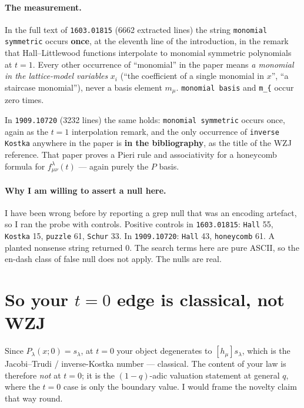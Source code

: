 \documentclass[11pt]{article}
\begin{document}
\paragraph{The measurement.} In the full text of \texttt{1603.01815} (6662 extracted
lines) the string \texttt{monomial symmetric} occurs \textbf{once}, at the eleventh
line of the introduction, in the remark that Hall--Littlewood functions interpolate to
monomial symmetric polynomials at $t=1$. Every other occurrence of ``monomial'' in the
paper means \emph{a monomial in the lattice-model variables} $x_i$ (``the coefficient
of a single monomial in $x$'', ``a staircase monomial''), never a basis element
$m_\mu$. \texttt{monomial basis} and \texttt{m\_\{} occur zero times.

In \texttt{1909.10720} (3232 lines) the same holds: \texttt{monomial symmetric} occurs
once, again as the $t=1$ interpolation remark, and the only occurrence of
\texttt{inverse Kostka} anywhere in the paper is \textbf{in the bibliography}, as the
title of the WZJ reference. That paper proves a Pieri rule and associativity for a
honeycomb formula for $f^\lambda_{\mu\nu}(t)$ --- again purely the $P$ basis.

\paragraph{Why I am willing to assert a null here.} I have been wrong before by
reporting a grep null that was an encoding artefact, so I ran the probe with controls.
Positive controls in \texttt{1603.01815}: \texttt{Hall} 55, \texttt{Kostka} 15,
\texttt{puzzle} 61, \texttt{Schur} 33. In \texttt{1909.10720}: \texttt{Hall} 43,
\texttt{honeycomb} 61. A planted nonsense string returned 0. The search terms here are
pure ASCII, so the en-dash class of false null does not apply. The nulls are real.

\section{So your $t=0$ edge is classical, not WZJ}

Since $P_\lambda(x;0)=s_\lambda$, at $t=0$ your object degenerates to
$[h_\mu]s_\lambda$, which is the Jacobi--Trudi / inverse-Kostka number --- classical.
The content of your law is therefore \emph{not} at $t=0$; it is the $(1-q)$-adic
valuation statement at general $q$, where the $t=0$ case is only the boundary value.
I would frame the novelty claim that way round.
\end{document}
